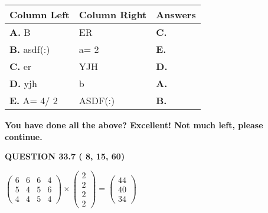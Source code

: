 \documentclass[12pt]{article}
\begin{document}
  
\begin{tabular}{|l|l|l|}
 \hline
 Column Left & Column Right  & Answers       \\ 
 \hline
{\textbf{\large{
A.}}}
B
  & 
ER
 & 
{\textbf{\large{
C.}}}
 \\ 
 \hline
{\textbf{\large{
B.}}}
asdf(:)
  & 
 a= %
2
 & 
{\textbf{\large{
E.}}}
 \\ 
 \hline
{\textbf{\large{
C.}}}
er
  & 
YJH
 & 
{\textbf{\large{
D.}}}
 \\ 
 \hline
{\textbf{\large{
D.}}}
yjh
  & 
b
 & 
{\textbf{\large{
A.}}}
 \\ 
 \hline
{\textbf{\large{
E.}}}
 A= %
4/ %
2

  & 
ASDF(:)
 & 
{\textbf{\large{
B.}}}
 \\ 
 \hline
 \end{tabular}
  
  
 
 
 
 
   
   
\vspace{0.3in}
{\textbf{\LARGE{You have done all the above? Excellent! Not much left, please continue.}}}
\vspace{0.3in}
   
   
  
\vspace{0.2in}
  
{\textbf{\Large{QUESTION
33.7 
 (          8,         15,         60)
}}}
  
  
 
 
\noindent{}

 
$\left( \begin{array}{ccccccccccccccc}
           6 & 
           6 & 
           6 & 
           4 \\ 
           5 & 
           4 & 
           5 & 
           6 \\ 
           4 & 
           4 & 
           5 & 
           4
\end{array}\right) \times
\left( \begin{array}{c}
           2 \\ 
           2 \\ 
           2 \\ 
           2
\end{array}\right)  =
\left( \begin{array}{c}
          44 \\ 
          40 \\ 
          34
\end{array}\right)  $
 
\end{document}
